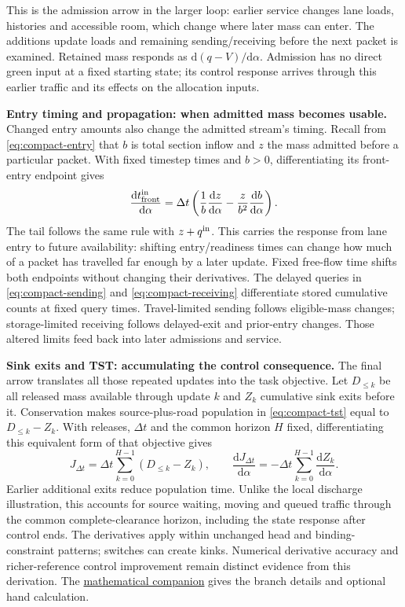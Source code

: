 \documentclass[10pt,a4paper]{article}
\newcommand{\rev}[1]{{\color{revisionred}#1}}
\begin{document}
\rev{This is the admission arrow in the larger loop:} earlier service changes
lane loads, histories and accessible room, which change where later mass
can enter. The additions update loads and remaining sending/receiving
before the next packet is examined. Retained mass responds as
$\mathrm d(q-V)/\mathrm d\alpha$. Admission has no direct green input
at a fixed starting state; its control response arrives through this
earlier traffic and its effects on the allocation inputs.

\textbf{\rev{Entry timing and propagation: when admitted mass becomes usable.}}
Changed entry amounts also change the admitted stream's timing.
Recall from \rev{\eqref{eq:compact-entry}} that $b$ is total section inflow
and $z$ the mass admitted before a particular packet. With fixed timestep
times and $b>0$, differentiating its front-entry endpoint gives
\begin{equation}
 \frac{\mathrm dt^{\rm in}_{\rm front}}{\mathrm d\alpha}
 =\Delta t\left(\frac1b\frac{\mathrm dz}{\mathrm d\alpha}
       -\frac z{b^2}\frac{\mathrm db}{\mathrm d\alpha}\right).
 \label{eq:compact-entry-derivative}
\end{equation}
The tail follows the same rule with $z+q^{\rm in}$.
\rev{This carries the response from lane entry to future availability:}
shifting entry/readiness times can change how much of a packet has
travelled far enough by a later update. Fixed free-flow time shifts both
endpoints without changing their derivatives.
The delayed queries in \rev{\eqref{eq:compact-sending}} and
\rev{\eqref{eq:compact-receiving}} differentiate stored cumulative counts at
fixed query times. Travel-limited sending follows eligible-mass changes;
storage-limited receiving follows delayed-exit and prior-entry changes.
Those altered limits feed back into later admissions and service.

\textbf{\rev{Sink exits and TST: accumulating the control consequence.}}
The final arrow translates all those repeated updates into the task
objective. Let $D_{\leq k}$ be all released mass available through update
$k$ and $Z_k$ cumulative sink exits before it. Conservation makes
source-plus-road population in \rev{\eqref{eq:compact-tst}} equal to
$D_{\leq k}-Z_k$. With releases, $\Delta t$ and the common horizon $H$
fixed, \rev{differentiating this equivalent form of that objective gives}
\begin{equation}
 J_{\Delta t}=\Delta t\sum_{k=0}^{H-1}(D_{\leq k}-Z_k),\qquad
 \frac{\mathrm dJ_{\Delta t}}{\mathrm d\alpha}
 =-\Delta t\sum_{k=0}^{H-1}\frac{\mathrm dZ_k}{\mathrm d\alpha}.
 \label{eq:compact-objective-derivative}
\end{equation}
Earlier additional exits reduce population time. Unlike the local
discharge illustration, this accounts for source waiting, moving and
queued traffic through the common complete-clearance horizon, including
the state response after control ends.
The derivatives apply within unchanged head and binding-constraint
patterns; switches can create kinks. Numerical derivative accuracy and
richer-reference control improvement remain distinct evidence from this
derivation. The \href{urban_methodology_specification.pdf}{mathematical companion}
gives the branch details and optional hand calculation.
\end{document}

